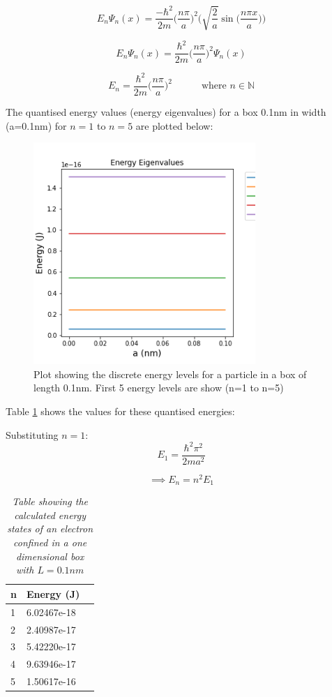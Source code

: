 $$E_n \Psi_n (x) = \frac{-\hbar ^{2}}{2m}\Big(\frac{n\pi}{a}\Big)^{2}\Bigg(\sqrt{\frac{2}{a}}\sin\Big(\frac{n\pi x}{a}\Big)\Bigg)$$

$$E_n \Psi_n (x) = \frac{\hbar ^{2}}{2m}\Big(\frac{n\pi}{a}\Big)^{2}\Psi_n (x)$$

$$E_n = \frac{\hbar ^{2}}{2m}\Big(\frac{n\pi}{a}\Big)^{2} \quad \quad \quad \text{where } n \in \mathbb{N}$$

The quantised energy values (energy eigenvalues) for a box 0.1nm in width (a=0.1nm) for $n=1$ to $n=5$ are plotted below:

\begin{figure}[h]
    \centering
    \includegraphics[width=0.75\textwidth]{lab1/images/eigenvaluesEnergy.png}
    \caption{Plot showing the discrete energy levels for a particle in a box of length 0.1nm. First 5 energy levels are show (n=1 to n=5)}
    \label{fig:eigenEnergy}
\end{figure}

Table \ref{tab:qEnerergy} shows the values for these quantised energies:

Substituting $n=1$:
$$E_1 = \frac{\hbar ^{2}\pi^{2}}{2ma^{2}}$$

\begin{equation}\label{eq:energySpacing}
\implies E_n =  n^{2}E_1
\end{equation}




\begin{table}[h!]
\centering
\begin{tabular}{|l|l|l|}
\hline
\textbf{n} & \textbf{Energy (J)} \\ \hline
1 & 6.02467e-18 \\ \hline
2 & 2.40987e-17 \\ \hline
3 & 5.42220e-17 \\ \hline
4 & 9.63946e-17 \\ \hline
5 & 1.50617e-16 \\ \hline
\end{tabular}
\caption{\textit{Table showing the calculated energy states of an electron confined in a one dimensional box with $L=0.1nm$}}
\label{tab:qEnerergy}
\end{table}


